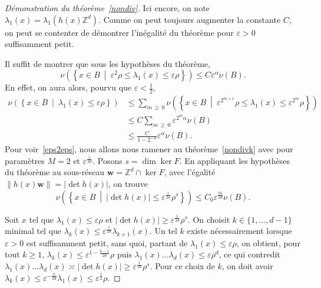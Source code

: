 \documentclass[AHL,Unicode,longabstracts,francais,published]{cedram}
\newcommand{\abs}[1]{\lvert#1\rvert}
\newcommand{\se}[2]{\{#1,\dots,#2\}}
\newcommand{\Z}{\mathbb{Z}}
\newcommand{\bw}{\mathbf{w}}
\newcommand{\eps}{\varepsilon}
\begin{document}
\begin{proof}[Démonstration du théorème~\ref{nondiv}]
Ici encore, on note $\lambda_1(x)=\lambda_1(h(x)\Z^d)$. Comme on peut toujours augmenter la constante $C$, on peut se contenter de démontrer l'inégalité du théorème pour $\eps>0$ suffisamment petit.

Il suffit de montrer que sous les hypothèses du théorème,
\begin{equation}\label{eps2eps}
\nu\left(\left\{x\in B\ \middle|\ \eps^2\rho \leq \lambda_1(x)\leq\eps\rho\right\}\right)
\leq C\eps^\alpha\nu(B).
\end{equation}
En effet, on aura alors, pourvu que $\eps<\frac{1}{2}$,
\begin{align*}
\nu\left(\left\{x\in B\ \middle|\ \lambda_1(x)\leq\eps\rho\right\}\right) & \leq \sum_{m\,\geq\,0} \nu\left(\left\{x\in B\ \middle|\ \eps^{2^{m+1}}\rho \leq \lambda_1(x)\leq\eps^{2^m}\rho\right\}\right)\\
& \leq C \sum_{m\,\geq\,0} \eps^{2^m\alpha}\nu(B)\\
& \leq \frac{C}{1-2^{-\alpha}} \eps^\alpha \nu(B).
\end{align*}
Pour voir~\eqref{eps2eps}, nous allons nous ramener au théorème~\ref{nondivk} avec pour paramètres $M=2$ et $\eps^{\frac{1}{2d}}$. Posons $s=\dim\ker F$. En appliquant les hypothèses du théorème au sous-réseau $\bw=\Z^d\cap\ker F$, avec l'égalité $\|h(x)\bw\|=\abs{\det h(x)}$, on trouve
\begin{equation}\label{det}
\nu\left(\left\{x\in B\ \middle|\ \abs{\det h(x)}\leq\eps^{\frac{1}{2d}}\rho^s\right\}\right) \leq C_0\eps^{\frac{\alpha_0}{2d}}\nu(B).
\end{equation}

Soit $x$ tel que $\lambda_1(x)\leq\eps\rho$ et $\abs{\det h(x)}\geq\eps^{\frac{1}{2d}}\rho^s$. On choisit $k\in\se{1}{d-1}$ minimal tel que $\lambda_k(x)\leq\eps^{\frac{1}{2d}}\lambda_{k+1}(x)$. Un tel $k$ existe nécessairement lorsque $\eps>0$ est suffisamment petit, sans quoi, partant de $\lambda_1(x)\leq\eps\rho$, on obtient, pour tout $k\geq 1$, $\lambda_k(x)\leq\eps^{1-\frac{k-1}{2d}}\rho$ puis $\lambda_1(x)\dots\lambda_d(x)\leq\eps\rho^d$, ce qui contredit $\lambda_1(x)\dots\lambda_d(x)\asymp \abs{\det h(x)}\geq \eps^{\frac{1}{2d}}\rho^s$. Pour ce choix de $k$, on doit avoir $\lambda_k(x)\leq\eps^{-\frac{k}{2d}}\lambda_1(x)\leq\eps^{\frac{1}{2}}\rho$.


\end{proof}
\end{document}
